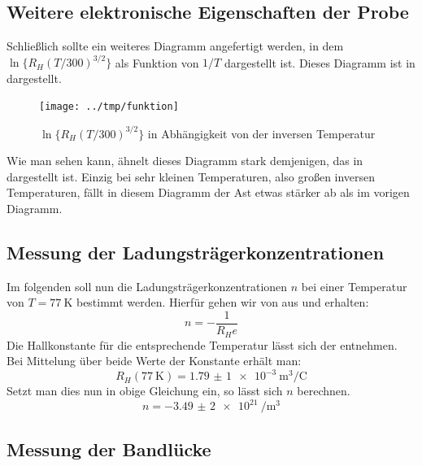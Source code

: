 \subsection{Weitere elektronische Eigenschaften der Probe}

Schließlich sollte ein weiteres Diagramm angefertigt werden, in dem
$\ln\{R_H(T/300)^{3/2}\}$ als Funktion von $1/T$ dargestellt ist. Dieses
Diagramm ist in  dargestellt.

\begin{figure}[htb]
   \centering
   \texttt{[image: ../tmp/funktion]}
   \caption{$\ln\{R_H(T/300)^{3/2}\}$ in Abhängigkeit von der inversen
   Temperatur}
   \label{fig:funktion}
\end{figure}

Wie man sehen kann, ähnelt dieses Diagramm stark demjenigen, das in
 dargestellt ist. Einzig bei sehr kleinen Temperaturen,
also großen inversen Temperaturen, fällt in diesem Diagramm der Ast etwas
stärker ab als im vorigen Diagramm.

\subsection{Messung der Ladungsträgerkonzentrationen}

Im folgenden soll nun die Ladungsträgerkonzentrationen $n$ bei einer Temperatur von
$T = \SI{77}{\kelvin}$ bestimmt werden. Hierfür gehen wir von 
aus
und erhalten:
\begin{equation}
 n = -\frac{1}{R_H e}
\end{equation}
Die Hallkonstante für die entsprechende Temperatur lässt sich der
 entnehmen. Bei Mittelung über beide Werte der Konstante
erhält man:
\begin{equation*}
 R_H(\SI{77}{\kelvin}) = \SI{1,79(1)e-3}{\meter\cubed\per\coulomb}
\end{equation*}
Setzt man dies nun in obige Gleichung ein, so lässt sich $n$ berechnen.
\begin{equation*}
 n = \SI{-3,49(2)e21}{\per\meter\cubed}
\end{equation*}

\subsection{Messung der Bandlücke}

